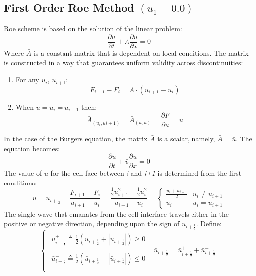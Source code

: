 \documentclass[11pt, a4paper]{article}
\begin{document}
\subsection{First Order Roe Method $(u_1 = 0.0)$}
\label{Roe_first}
Roe scheme is based on the solution of the linear problem:
\begin{equation}
        \displaystyle\frac{\partial u}{\partial t} + \bar{A}\frac{\partial u}{\partial x} = 0 
\end{equation}
Where $\bar{A}$ is a constant matrix that is dependent on local conditions. The matrix is constructed in a way that guarantees uniform validity across discontinuities: 
\begin{enumerate}
    \item For any $u_i$, $u_{i+1}$:\begin{equation*}
        F_{i+1}-F_{i} = \bar{A}\cdot\left(u_{i+1}-u_i\right)
    \end{equation*}
    \item When $u=u_i=u_{i+1}$ then:\begin{equation*}
        \bar{A}_{\left(u_i,u{i+1}\right)}=\bar{A}_{\left(u,u\right)}=\frac{\partial F}{\partial u}=u
    \end{equation*}
\end{enumerate}
In the case of the Burgers equation, the matrix $\bar{A}$ is a scalar, namely, $\bar{A}=\bar{u}$. The equation becomes:
\begin{equation}
        \displaystyle\frac{\partial u}{\partial t} + \bar{u}\frac{\partial u}{\partial x} = 0 
\end{equation}
The value of $\bar{u}$ for the cell face between \emph{i} and \emph{i+1} is determined from the first conditions:
\begin{equation}
    \bar{u}=\bar{u}_{i+\frac{1}{2}}=\frac{F_{i+1}-F_i}{u_{i+1}-u_i}=\frac{\displaystyle\frac{1}{2}u_{i+1}^2-\frac{1}{2}u_i^2}{u_{i+1}-u_i}=\left\{\begin{array}{cc}
        \displaystyle\frac{u_i+u_{i+1}}{2} & u_i\neq u_{i+1} \\
        u_i & u_i=u_{i+1} 
    \end{array}\right.
\end{equation}
The single wave that emanates from the cell interface travels either in the positive or negative direction, depending upon the sign of $\bar{u}_{i+\frac{1}{2}}$. Define:
\begin{equation}
    \left\{\begin{array}{cc}
        \begin{array}{c}
            \bar{u}_{i+\frac{1}{2}}^+\triangleq\displaystyle\frac{1}{2}\left(\bar{u}_{i+\frac{1}{2}}+\left|\bar{u}_{i+\frac{1}{2}}\right|\right)\geq0 \\\\
            \bar{u}_{i+\frac{1}{2}}^-\triangleq\displaystyle\frac{1}{2}\left(\bar{u}_{i+\frac{1}{2}}-\left|\bar{u}_{i+\frac{1}{2}}\right|\right)\leq0 \\
        \end{array} & \bar{u}_{i+\frac{1}{2}}=\bar{u}_{i+\frac{1}{2}}^++\bar{u}_{i+\frac{1}{2}}^-
    \end{array}\right.
\end{equation}
\end{document}
